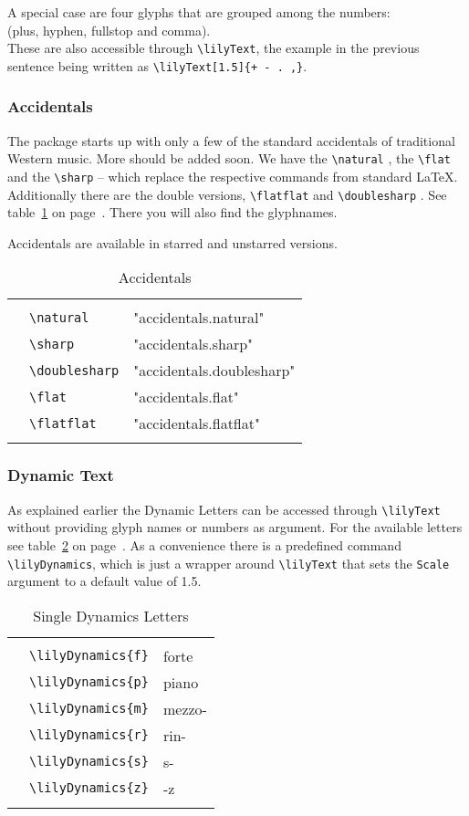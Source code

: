 \documentclass{article}
\newcommand*{\cmd}[1]{\texttt{\textbackslash #1}}
\newcommand{\tmpCaption}{} %
\newcommand{\tmpLabel}{}
\newenvironment{reftable}[2]
	{%
		\renewcommand{\tmpCaption}{#1}
		\renewcommand{\tmpLabel}{#2}
		\begin{table}[ht]
		\begin{center}
		\begin{tabular}[t]{lll}
		\hline
		&\\
	}
	{%
		&\\
		\hline
		\end{tabular}
		\caption{\tmpCaption}
		\label{table:\tmpLabel}
		\end{center}
		\end{table}
	}
\begin{document}
A special case are four glyphs that are grouped among the numbers:\\
 (plus, hyphen, fullstop and comma). \\
These are also accessible through \cmd{lilyText}, the example in the previous sentence being written as \cmd{lilyText[1.5]\{+~-~.~,\}}.

\subsubsection{Accidentals}
The package starts up with only a few of the standard accidentals of traditional Western music. More should be added soon. We have the \cmd{natural} \natural, the \cmd{flat} \flat* and the \cmd{sharp} \sharp* -- which replace the respective commands from standard \LaTeX. Additionally there are the double versions, \cmd{flatflat} \flatflat* and \cmd{doublesharp} \doublesharp. See table~\ref{table:accidentals} on page~\pageref{table:accidentals}. There you will also find the glyphnames.

Accidentals are available in starred and unstarred versions.

\begin{reftable}{Accidentals}{accidentals}
\natural & \cmd{natural} & "accidentals.natural"\\
\sharp & \cmd{sharp} & "accidentals.sharp"\\
\doublesharp & \cmd{doublesharp} & "accidentals.doublesharp"\\
\flat & \cmd{flat} & "accidentals.flat"\\
\flatflat & \cmd{flatflat} & "accidentals.flatflat"\\
\end{reftable}



\subsubsection{Dynamic Text}
As explained earlier the Dynamic Letters can be accessed through \cmd{lilyText} without providing glyph names or numbers as argument. For the available letters see table~\ref{table:singleDynLetters} on page~\pageref{table:singleDynLetters}. As a convenience there is a predefined command \cmd{lilyDynamics}, which is just a wrapper around \cmd{lilyText} that sets the \texttt{Scale} argument to a default value of 1.5.

\begin{reftable}{Single Dynamics Letters}{singleDynLetters}
\lilyDynamics{f} & \cmd{lilyDynamics\{f\}} & forte\\
\lilyDynamics{p} & \cmd{lilyDynamics\{p\}} & piano\\
\lilyDynamics{m} & \cmd{lilyDynamics\{m\}} & mezzo-\\
\lilyDynamics{r} & \cmd{lilyDynamics\{r\}} & rin-\\
\lilyDynamics{s} & \cmd{lilyDynamics\{s\}} & s-\\
\lilyDynamics{z} & \cmd{lilyDynamics\{z\}} & -z\\
\end{reftable}
\end{document}
